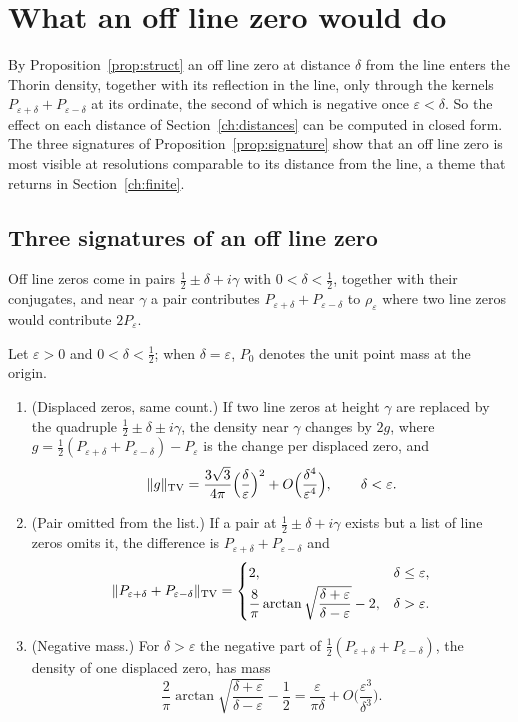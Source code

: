 \section{What an off line zero would do}\label{ch:offline}

By Proposition~\ref{prop:struct} an off line zero at distance $\delta$ from the line enters the Thorin density, together with its reflection in the line, only through the kernels $P_{\varepsilon+\delta}+P_{\varepsilon-\delta}$ at its ordinate, the second of which is negative once $\varepsilon<\delta$. So the effect on each distance of Section~\ref{ch:distances} can be computed in closed form. The three signatures of Proposition~\ref{prop:signature} show that an off line zero is most visible at resolutions comparable to its distance from the line, a theme that returns in Section~\ref{ch:finite}.

\subsection{Three signatures of an off line zero}\label{sec:ch8:signatures}

Off line zeros come in pairs $\tfrac12\pm\delta+i\gamma$ with $0<\delta<\tfrac12$, together with their conjugates, and near $\gamma$ a pair contributes $P_{\varepsilon+\delta}+P_{\varepsilon-\delta}$ to $\rho_\varepsilon$ where two line zeros would contribute $2P_\varepsilon$.

\begin{proposition}\label{prop:signature}
Let $\varepsilon>0$ and $0<\delta<\tfrac12$; when $\delta=\varepsilon$, $P_0$ denotes the unit point mass at the origin.
\begin{enumerate}
\item[(i)] (Displaced zeros, same count.) If two line zeros at height $\gamma$ are replaced by the quadruple $\tfrac12\pm\delta\pm i\gamma$, the density near $\gamma$ changes by $2g$, where $g=\tfrac12(P_{\varepsilon+\delta}+P_{\varepsilon-\delta})-P_\varepsilon$ is the change per displaced zero, and
\[
\lVert g\rVert_{\mathrm{TV}}=\frac{3\sqrt3}{4\pi}\Big(\frac\delta\varepsilon\Big)^2+O\Big(\frac{\delta^4}{\varepsilon^4}\Big),\qquad \delta<\varepsilon .
\]
\item[(ii)] (Pair omitted from the list.) If a pair at $\tfrac12\pm\delta+i\gamma$ exists but a list of line zeros omits it, the difference is $P_{\varepsilon+\delta}+P_{\varepsilon-\delta}$ and
\[
\lVert P_{\varepsilon+\delta}+P_{\varepsilon-\delta}\rVert_{\mathrm{TV}}=\begin{cases}2,&\delta\le\varepsilon,\\[2pt] \dfrac8\pi\arctan\sqrt{\dfrac{\delta+\varepsilon}{\delta-\varepsilon}}-2,&\delta>\varepsilon.\end{cases}
\]
\item[(iii)] (Negative mass.) For $\delta>\varepsilon$ the negative part of $\tfrac12(P_{\varepsilon+\delta}+P_{\varepsilon-\delta})$, the density of one displaced zero, has mass \[\frac2\pi\arctan\sqrt{\frac{\delta+\varepsilon}{\delta-\varepsilon}}-\frac12=\frac{\varepsilon}{\pi\delta}+O\Big(\frac{\varepsilon^3}{\delta^3}\Big).\]
\end{enumerate}
\end{proposition}

